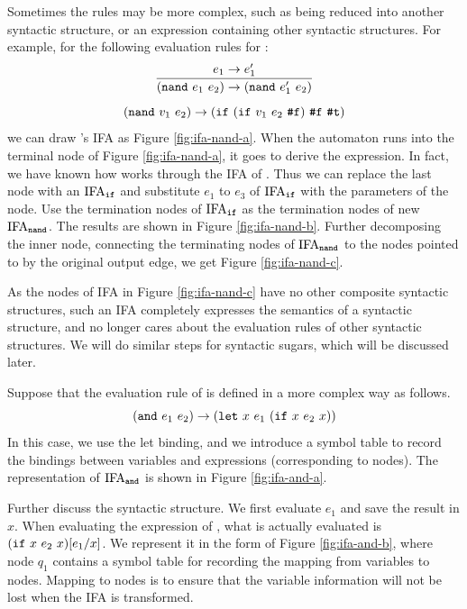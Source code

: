 \begin{example}
    Sometimes the rules may be more complex, such as being reduced into another syntactic structure, or an expression containing other syntactic structures. For example, for the following evaluation rules for :
    \[
        \infer{(\m{nand}~e_1~e_2) \to (\m{nand}~e_1'~e_2)}{e_1 \to e_1'}
    \]\[
        (\mbox{\tt nand}~v_1~e_2) \to (\mbox{\tt if}~(\mbox{\tt if}~v_1~e_2~\mbox{\tt \#f})~\mbox{\tt \#f}~\mbox{\tt \#t})
    \]
    we can draw 's IFA as Figure \ref{fig:ifa-nand-a}.
    When the automaton runs into the terminal node of Figure \ref{fig:ifa-nand-a}, it goes to derive the  expression. In fact, we have known how  works through the IFA of . Thus we can replace the last node with an $\text{IFA}_{\mbox{\tt \scriptsize if}}$ and substitute $e_1$ to $e_3$ of $\text{IFA}_{\mbox{\tt \scriptsize if}}$ with the parameters of the node. Use the termination nodes of $\text{IFA}_{\mbox{\tt \scriptsize if}}$ as the termination nodes of new $\text{IFA}_{\mbox{\tt \scriptsize \scriptsize nand}}$. The results are shown in Figure \ref{fig:ifa-nand-b}. Further decomposing the inner  node, connecting the terminating nodes of $\text{IFA}_{\mbox{\tt \scriptsize nand}}$ to the nodes pointed to by the original output edge, we get Figure \ref{fig:ifa-nand-c}.

    As the nodes of IFA in Figure \ref{fig:ifa-nand-c} have no other composite syntactic structures, such an IFA completely expresses the semantics of a syntactic structure, and no longer cares about the evaluation rules of other syntactic structures. We will do similar steps for syntactic sugars, which will be discussed later.
    \myend
\end{example}

\begin{example}

    Suppose that the evaluation rule of  is defined in a more complex way as follows.
    \[
        (\mbox{\tt and}~e_1~e_2) \to (\mbox{\tt let}~x~e_1~(\mbox{\tt if}~x~e_2~x))
    \]
    In this case, we use the let binding, and we introduce a symbol table to record the bindings between variables and expressions (corresponding to nodes). The representation of $\text{IFA}_{\mbox{\tt \scriptsize and}}$ is shown in Figure \ref{fig:ifa-and-a}.

    Further discuss the syntactic structure. We first evaluate $e_1$ and save the result in $x$. When evaluating the expression of , what is actually evaluated is $(\mbox{\tt if}~x~e_2~x)[e_1/x]$. We represent it in the form of Figure \ref{fig:ifa-and-b}, where node $q_1$ contains a symbol table for recording the mapping from variables to nodes.
    Mapping to nodes is to ensure that the variable information will not be lost when the IFA is transformed.
    \myend
\end{example}


